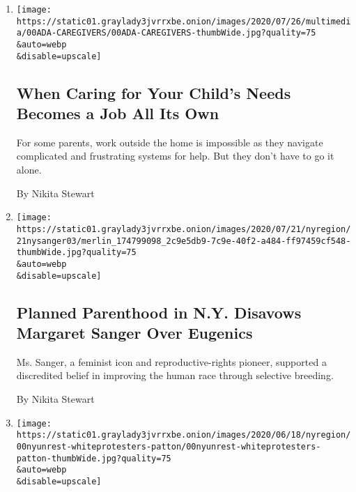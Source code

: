 \begin{enumerate}
\def\labelenumi{\arabic{enumi}.}
\item
  \href{/2020/07/24/us/children-disabilities-parenting-poverty-assistance.html}{}

  \texttt{[image: https://static01.graylady3jvrrxbe.onion/images/2020/07/26/multimedia/00ADA-CAREGIVERS/00ADA-CAREGIVERS-thumbWide.jpg?quality=75\\\&auto=webp\\\&disable=upscale]}

  \hypertarget{when-caring-for-your-childs-needs-becomes-a-job-all-its-own}{%
  \subsection{When Caring for Your Child's Needs Becomes a Job All Its
  Own}\label{when-caring-for-your-childs-needs-becomes-a-job-all-its-own}}

  For some parents, work outside the home is impossible as they navigate
  complicated and frustrating systems for help. But they don't have to
  go it alone.

  By Nikita Stewart
\item
  \href{/2020/07/21/nyregion/planned-parenthood-margaret-sanger-eugenics.html}{}

  \texttt{[image: https://static01.graylady3jvrrxbe.onion/images/2020/07/21/nyregion/21nysanger03/merlin\_174799098\_2c9e5db9-7c9e-40f2-a484-ff97459cf548-thumbWide.jpg?quality=75\\\&auto=webp\\\&disable=upscale]}

  \hypertarget{planned-parenthood-in-ny-disavows-margaret-sanger-over-eugenics}{%
  \subsection{Planned Parenthood in N.Y. Disavows Margaret Sanger Over
  Eugenics}\label{planned-parenthood-in-ny-disavows-margaret-sanger-over-eugenics}}

  Ms. Sanger, a feminist icon and reproductive-rights pioneer, supported
  a discredited belief in improving the human race through selective
  breeding.

  By Nikita Stewart
\item
  \href{/2020/06/26/nyregion/black-lives-matter-white-people-protesters.html}{}

  \texttt{[image: https://static01.graylady3jvrrxbe.onion/images/2020/06/18/nyregion/00nyunrest-whiteprotesters-patton/00nyunrest-whiteprotesters-patton-thumbWide.jpg?quality=75\\\&auto=webp\\\&disable=upscale]}


\end{enumerate}
